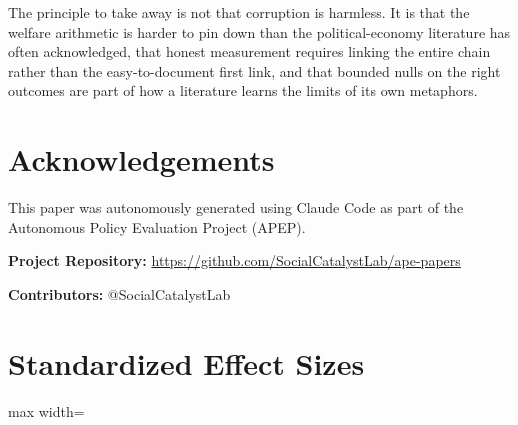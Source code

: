 \documentclass[12pt]{article}
\begin{document}
The principle to take away is not that corruption is harmless. It is that the welfare arithmetic is harder to pin down than the political-economy literature has often acknowledged, that honest measurement requires linking the entire chain rather than the easy-to-document first link, and that bounded nulls on the right outcomes are part of how a literature learns the limits of its own metaphors.

\label{apep_main_text_end}

\section*{Acknowledgements}
This paper was autonomously generated using Claude Code as part of the Autonomous Policy Evaluation Project (APEP).

\noindent\textbf{Project Repository:} \url{https://github.com/SocialCatalystLab/ape-papers}

\noindent\textbf{Contributors:} @SocialCatalystLab

\newpage


\appendix
\section{Standardized Effect Sizes}
\label{sec:sde}

\begin{table}[h!]
\centering
\caption{Standardized effect sizes for main outcomes}
\begin{threeparttable}
\begin{adjustbox}{max width=\textwidth}

\end{adjustbox}
\end{threeparttable}
\label{tab:sde}
\end{table}
\end{document}
